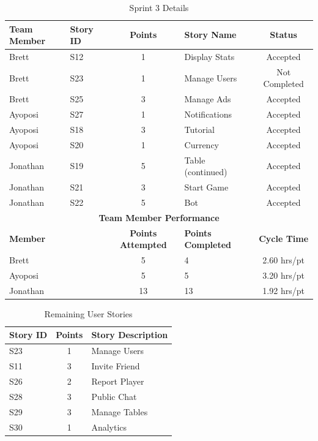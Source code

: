 \begin{table}[h]
\centering
\caption{Sprint 3 Details}
\label{tab:sprint-3-details}
\begin{tabular}{|l|l|c|p{4cm}|c|}
\hline
\textbf{Team Member} & \textbf{Story ID} & \textbf{Points} & \textbf{Story Name} & \textbf{Status} \\
\hline
Brett & S12 & 1 & Display Stats & Accepted \\
Brett & S23 & 1 & Manage Users & Not Completed \\
Brett & S25 & 3 & Manage Ads & Accepted \\
Ayoposi & S27 & 1 & Notifications & Accepted \\
Ayoposi & S18 & 3 & Tutorial & Accepted \\
Ayoposi & S20 & 1 & Currency & Accepted \\
Jonathan & S19 & 5 & Table (continued) & Accepted \\
Jonathan & S21 & 3 & Start Game & Accepted \\
Jonathan & S22 & 5 & Bot & Accepted \\
\hline
\multicolumn{5}{|c|}{\textbf{Team Member Performance}} \\
\hline
\multicolumn{2}{|l|}{\textbf{Member}} & \textbf{Points Attempted} & \textbf{Points Completed} & \textbf{Cycle Time} \\
\hline
\multicolumn{2}{|l|}{Brett} & 5 & 4 & 2.60 hrs/pt \\
\multicolumn{2}{|l|}{Ayoposi} & 5 & 5 & 3.20 hrs/pt \\
\multicolumn{2}{|l|}{Jonathan} & 13 & 13 & 1.92 hrs/pt \\
\hline
\end{tabular}
\end{table}

\begin{table}[h]
\centering
\caption{Remaining User Stories}
\label{tab:future-stories}
\begin{tabular}{|l|c|p{8cm}|}
\hline
\textbf{Story ID} & \textbf{Points} & \textbf{Story Description} \\
\hline
S23 & 1 & Manage Users \\
S11 & 3 & Invite Friend \\
S26 & 2 & Report Player \\
S28 & 3 & Public Chat \\
S29 & 3 & Manage Tables \\
S30 & 1 & Analytics \\
\hline
\end{tabular}
\end{table}
\newpage
